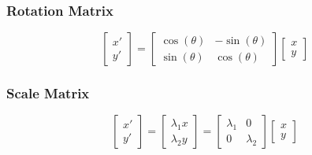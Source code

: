 \documentclass{article}
\begin{document}
        \subsubsection {Rotation Matrix}
        \begin{equation}
            \begin{bmatrix} x' \\ y' \end{bmatrix} = \begin{bmatrix} \cos(\theta) & -\sin(\theta) \\ \sin(\theta) & \cos(\theta) \end{bmatrix} \begin{bmatrix} x \\ y \end{bmatrix}
        \end{equation}

        \subsubsection {Scale Matrix}
        \begin{equation}
            \begin{bmatrix} x' \\ y' \end{bmatrix} = \begin{bmatrix} \lambda_1 x \\ \lambda_2 y \end{bmatrix} = \begin{bmatrix} \lambda_1 & 0 \\ 0 & \lambda_2 \end{bmatrix} \begin{bmatrix} x \\ y \end{bmatrix}
        \end{equation}
\end{document}
